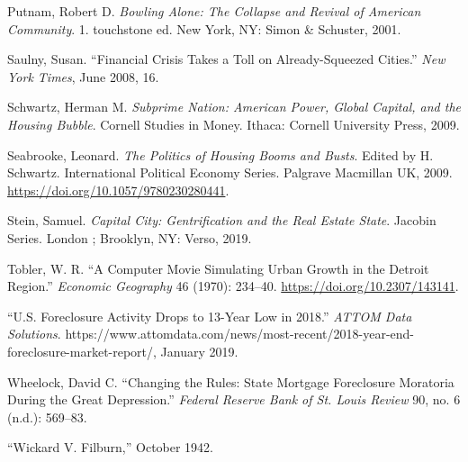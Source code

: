 \documentclass[
]{article}
\begin{document}
\leavevmode\hypertarget{ref-putnam2001bowling}{}%
Putnam, Robert D. \emph{Bowling Alone: The Collapse and Revival of
American Community}. 1. touchstone ed. New York, NY: Simon \& Schuster,
2001.

\leavevmode\hypertarget{ref-saulny2008financial}{}%
Saulny, Susan. ``Financial Crisis Takes a Toll on Already-Squeezed
Cities.'' \emph{New York Times}, June 2008, 16.

\leavevmode\hypertarget{ref-schwartz2009subprime}{}%
Schwartz, Herman M. \emph{Subprime Nation: American Power, Global
Capital, and the Housing Bubble}. Cornell Studies in Money. Ithaca:
Cornell University Press, 2009.

\leavevmode\hypertarget{ref-seabrooke2009politics}{}%
Seabrooke, Leonard. \emph{The Politics of Housing Booms and Busts}.
Edited by H. Schwartz. International Political Economy Series. Palgrave
Macmillan UK, 2009. \url{https://doi.org/10.1057/9780230280441}.

\leavevmode\hypertarget{ref-stein2019capital}{}%
Stein, Samuel. \emph{Capital City: Gentrification and the Real Estate
State}. Jacobin Series. London ; Brooklyn, NY: Verso, 2019.

\leavevmode\hypertarget{ref-tobler1970computer}{}%
Tobler, W. R. ``A Computer Movie Simulating Urban Growth in the Detroit
Region.'' \emph{Economic Geography} 46 (1970): 234--40.
\url{https://doi.org/10.2307/143141}.

\leavevmode\hypertarget{ref-2019foreclosure}{}%
``U.S. Foreclosure Activity Drops to 13-Year Low in 2018.'' \emph{ATTOM
Data Solutions}.
https://www.attomdata.com/news/most-recent/2018-year-end-foreclosure-market-report/,
January 2019.

\leavevmode\hypertarget{ref-wheelockChangingRulesState2008}{}%
Wheelock, David C. ``Changing the Rules: State Mortgage Foreclosure
Moratoria During the Great Depression.'' \emph{Federal Reserve Bank of
St. Louis Review} 90, no. 6 (n.d.): 569--83.

\leavevmode\hypertarget{ref-1942wickard}{}%
``Wickard V. Filburn,'' October 1942.
\end{document}
